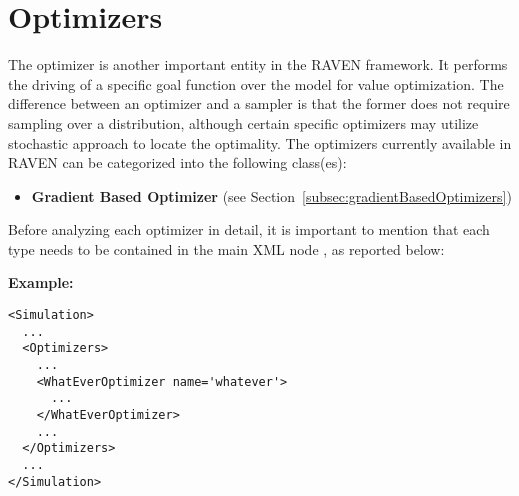 \section{Optimizers}
\label{sec:Optimizers}

\renewcommand{\nameDescription}
{
  \xmlAttr{name},
  \xmlDesc{required string attribute}, user-defined name of this optimizer.
  \nb As with other objects, this identifier can be used to reference this
  specific entity from other input blocks in the XML.
}
\renewcommand{\specBlock}[2]
{
  The specifications of this optimizer must be defined within #1 \xmlNode{#2} XML
  block.
}



The optimizer is another important entity in the RAVEN framework. It performs the driving of a specific goal function 
over the model for value optimization. The difference between an optimizer and a sampler is that the former does not require
 sampling over a distribution, although certain specific optimizers may utilize stochastic approach to locate the optimality.
The optimizers currently available in RAVEN can be categorized into the following class(es):
\begin{itemize}
\item \textbf{Gradient Based Optimizer} (see Section~\ref{subsec:gradientBasedOptimizers})
\end{itemize}

Before analyzing each optimizer in detail, it is important to mention that each type needs to be contained in the main XML 
node , as reported below:

\textbf{Example:}

\begin{lstlisting}[style=XML]
<Simulation>
  ...
  <Optimizers>
    ...
    <WhatEverOptimizer name='whatever'>
      ...
    </WhatEverOptimizer>
    ...
  </Optimizers>
  ...
</Simulation>
\end{lstlisting}

